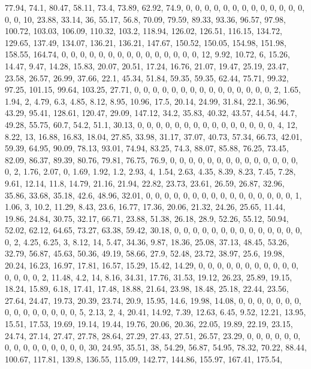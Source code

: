 \documentclass[
]{article}
\begin{document}
77.94, 74.1, 80.47, 58.11, 73.4, 73.89, 62.92, 74.9, 0, 0, 0, 0, 0, 0,
0, 0, 0, 0, 0, 0, 0, 0, 0, 10, 23.88, 33.14, 36, 55.17, 56.8, 70.09,
79.59, 89.33, 93.36, 96.57, 97.98, 100.72, 103.03, 106.09, 110.32,
103.2, 118.94, 126.02, 126.51, 116.15, 134.72, 129.65, 137.49, 134.07,
136.21, 136.21, 147.67, 150.52, 150.05, 154.98, 151.98, 158.55, 164.74,
0, 0, 0, 0, 0, 0, 0, 0, 0, 0, 0, 0, 0, 0, 0, 12, 9.92, 10.72, 6, 15.26,
14.47, 9.47, 14.28, 15.83, 20.07, 20.51, 17.24, 16.76, 21.07, 19.47,
25.19, 23.47, 23.58, 26.57, 26.99, 37.66, 22.1, 45.34, 51.84, 59.35,
59.35, 62.44, 75.71, 99.32, 97.25, 101.15, 99.64, 103.25, 27.71, 0, 0,
0, 0, 0, 0, 0, 0, 0, 0, 0, 0, 0, 0, 0, 2, 1.65, 1.94, 2, 4.79, 6.3,
4.85, 8.12, 8.95, 10.96, 17.5, 20.14, 24.99, 31.84, 22.1, 36.96, 43.29,
95.41, 128.61, 120.47, 29.09, 147.12, 34.2, 35.83, 40.32, 43.57, 44.54,
44.7, 49.28, 55.75, 60.7, 54.2, 51.1, 30.13, 0, 0, 0, 0, 0, 0, 0, 0, 0,
0, 0, 0, 0, 0, 0, 4, 12, 8.22, 13, 16.88, 16.83, 18.04, 27.85, 33.98,
31.17, 37.07, 40.73, 57.34, 66.73, 42.01, 59.39, 64.95, 90.09, 78.13,
93.01, 74.94, 83.25, 74.3, 88.07, 85.88, 76.25, 73.45, 82.09, 86.37,
89.39, 80.76, 79.81, 76.75, 76.9, 0, 0, 0, 0, 0, 0, 0, 0, 0, 0, 0, 0, 0,
0, 0, 2, 1.76, 2.07, 0, 1.69, 1.92, 1.2, 2.93, 4, 1.54, 2.63, 4.35,
8.39, 8.23, 7.45, 7.28, 9.61, 12.14, 11.8, 14.79, 21.16, 21.94, 22.82,
23.73, 23.61, 26.59, 26.87, 32.96, 35.86, 33.68, 35.18, 42.6, 48.96,
32.01, 0, 0, 0, 0, 0, 0, 0, 0, 0, 0, 0, 0, 0, 0, 0, 0, 1, 1.06, 3, 10.2,
11.29, 8.43, 23.6, 16.77, 17.36, 20.06, 21.32, 24.26, 25.65, 11.44,
19.86, 24.84, 30.75, 32.17, 66.71, 23.88, 51.38, 26.18, 28.9, 52.26,
55.12, 50.94, 52.02, 62.12, 64.65, 73.27, 63.38, 59.42, 30.18, 0, 0, 0,
0, 0, 0, 0, 0, 0, 0, 0, 0, 0, 0, 0, 2, 4.25, 6.25, 3, 8.12, 14, 5.47,
34.36, 9.87, 18.36, 25.08, 37.13, 48.45, 53.26, 32.79, 56.87, 45.63,
50.36, 49.19, 58.66, 27.9, 52.48, 23.72, 38.97, 25.6, 19.98, 20.24,
16.23, 16.97, 17.81, 16.57, 15.29, 15.42, 14.29, 0, 0, 0, 0, 0, 0, 0, 0,
0, 0, 0, 0, 0, 0, 0, 2, 11.48, 4.2, 14, 8.16, 34.31, 17.76, 31.53,
19.12, 26.23, 25.89, 19.15, 18.24, 15.89, 6.18, 17.41, 17.48, 18.88,
21.64, 23.98, 18.48, 25.18, 22.44, 23.56, 27.64, 24.47, 19.73, 20.39,
23.74, 20.9, 15.95, 14.6, 19.98, 14.08, 0, 0, 0, 0, 0, 0, 0, 0, 0, 0, 0,
0, 0, 0, 0, 5, 2.13, 2, 4, 20.41, 14.92, 7.39, 12.63, 6.45, 9.52, 12.21,
13.95, 15.51, 17.53, 19.69, 19.14, 19.44, 19.76, 20.06, 20.36, 22.05,
19.89, 22.19, 23.15, 24.74, 27.14, 27.47, 27.78, 28.64, 27.29, 27.43,
27.51, 26.57, 23.29, 0, 0, 0, 0, 0, 0, 0, 0, 0, 0, 0, 0, 0, 0, 0, 30,
24.95, 35.51, 38, 54.29, 56.87, 54.95, 78.32, 70.22, 88.44, 100.67,
117.81, 139.8, 136.55, 115.09, 142.77, 144.86, 155.97, 167.41, 175.54,
\end{document}
